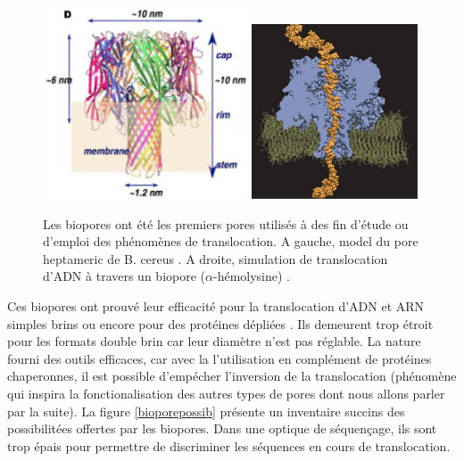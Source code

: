 \documentclass[a4paper,11pt]{article}
\begin{document}
\begin{figure}[H]
\begin{center}
\includegraphics[width=0.54\textwidth]{bioporetoxine.png}
\includegraphics[width=0.44\textwidth]{biopore2.jpg}

\caption{Les biopores ont été les premiers pores utilisés à des fin d'étude ou d'emploi des phénomènes de translocation. A gauche, model du pore heptameric de B. cereus \cite{Ramarao2013}. A droite, simulation de translocation d'ADN à travers un biopore ($\alpha$-hémolysine) \cite{Aksimentiev2010}.}
\label{biopore}
\end{center}
\end{figure}

Ces biopores ont prouvé leur efficacité pour la translocation d'ADN et ARN simples brins ou encore pour des protéines dépliées \cite{Movileanu2005}. Ils demeurent trop étroit pour les formats double brin car leur diamètre n'est pas réglable. La nature fourni des outils efficaces, car avec la l'utilisation en complément de protéines chaperonnes, il est possible d'empécher l'inversion de la translocation \cite{DeLosRios2006} (phénomène qui inspira la fonctionalisation des autres types de pores dont nous allons parler par la suite). La figure \ref{bioporepossib} présente un inventaire succins des possibilitées offertes par les biopores. Dans une optique de séquençage, ils sont trop épais pour permettre de discriminer les séquences en cours de translocation.
\end{document}
